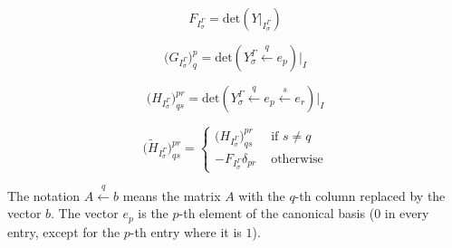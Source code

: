 \documentclass[a4paper,11pt]{article}
\begin{document}
\begin{equation}
  F_{I_\sigma^\Gamma} = \text{det} \left( Y\big|_{I_\sigma^\Gamma} \right)
\end{equation}

\begin{equation}
  \big( G_{I_\sigma^\Gamma} \big)^p_q = \text{det} \left( Y_\sigma^\Gamma \overset{q}{\leftarrow} e_p \right) \big|_I
\end{equation}

\begin{equation}
  \big( H_{I_\sigma^\Gamma} \big)^{pr}_{qs} =
  \text{det} \left( Y_\sigma^\Gamma \overset{q}{\leftarrow} e_p
    \overset{s}{\leftarrow} e_r \right) \big|_I
\end{equation}

\begin{equation}
  \big( \tilde{H}_{I_\sigma^\Gamma} \big)^{pr}_{qs} =
  \left\{
    \begin{array}{ll}
      \big( H_{I_\sigma^\Gamma} \big)^{pr}_{qs} & \text{ if } s \ne q\\
      -F_{I_\sigma^\Gamma} \delta_{pr} & \text{ otherwise}
    \end{array}
  \right.
\end{equation}

The notation $A \overset{q}{\leftarrow}b$ means the matrix $A$ with the $q$-th column replaced by the vector $b$.
The vector $e_p$ is the $p$-th element of the canonical basis ($0$ in every entry, except for the $p
$-th entry where it is $1$).
\end{document}
